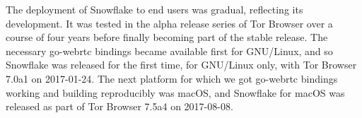 \documentclass[letterpaper,twocolumn]{article}
\begin{document}

The deployment of Snowflake to end users was gradual,
reflecting its development.
It was tested in the alpha release series of Tor Browser
over a course of four years
before finally becoming part of the stable release.
The necessary go-webrtc bindings became available first for GNU/Linux,
and so Snowflake was released for the first time, for GNU/Linux only,
with Tor Browser 7.0a1 on \mbox{2017-01-24}.
The next platform for which we got go-webrtc bindings working
and building reproducibly was macOS,
and Snowflake for macOS was released as part of
Tor Browser 7.5a4 on \mbox{2017-08-08}.
\end{document}
